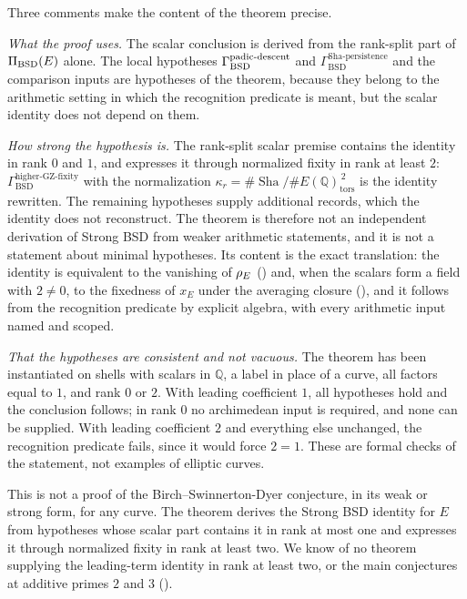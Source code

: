 \documentclass[11pt]{article}
\theoremstyle{definition}
\newcommand{\Q}{\mathbb{Q}}
\newcommand{\Sha}{\operatorname{Sha}}
\newcommand{\tors}{\operatorname{tors}}
\newcommand{\kapr}{\kappa_r}
\newcommand{\GammaSP}{\Gamma_{\mathrm{BSD}}^{\mathrm{Sha\text{-}persistence}}}
\newcommand{\GammaGZ}{\Gamma_{\mathrm{BSD}}^{\mathrm{higher\text{-}GZ\text{-}fixity}}}
\begin{document}
Three comments make the content of the theorem precise.

\emph{What the proof uses.}  The scalar conclusion is derived from the
rank-split part of $\Pi_{\mathrm{BSD}}(E)$ alone.  The local hypotheses $\Gamma_{\mathrm{BSD}}^{\mathrm{padic\text{-}descent}}$
and $\GammaSP$ and the comparison inputs are hypotheses of the theorem,
because they belong to the arithmetic setting in which the recognition
predicate is meant, but the scalar identity does not depend on them.

\emph{How strong the hypothesis is.}  The rank-split scalar premise
contains the identity in rank $0$ and $1$, and expresses it through
normalized fixity in rank at least $2$: $\GammaGZ$ with the normalization
$\kapr=\#\Sha/\#E(\Q)_{\tors}^{\,2}$ is the identity rewritten.  The
remaining hypotheses supply additional records, which the identity does
not reconstruct.  The theorem is therefore not an independent derivation of
Strong BSD from weaker arithmetic statements, and it is not a statement
about minimal hypotheses.  Its content is the exact translation: the
identity is equivalent to the vanishing of $\rho_E$
() and, when the scalars form a
field with $2\neq0$, to the fixedness of $x_E$ under the averaging closure
(),
and it follows from the recognition predicate by explicit algebra, with
every arithmetic input named and scoped.

\emph{That the hypotheses are consistent and not vacuous.}  The theorem
has been instantiated on shells with scalars in $\Q$, a label in place of
a curve, all factors equal to $1$, and rank $0$ or $2$.  With leading
coefficient $1$, all hypotheses hold and the conclusion follows; in rank
$0$ no archimedean input is required, and none can be supplied.  With
leading coefficient $2$ and everything else unchanged, the recognition
predicate fails, since it would force $2=1$.  These are formal checks of
the statement, not examples of elliptic curves.

\begin{nonclaim}\label{nonclaim:closure:landing-conditional}
This is not a proof of the Birch--Swinnerton-Dyer conjecture, in its weak
or strong form, for any curve.  The theorem derives the Strong BSD
identity for $E$ from hypotheses whose scalar part contains it in rank at
most one and expresses it through normalized fixity in rank at least two.
We know of no theorem supplying the leading-term identity in rank at
least two, or the main conjectures at additive primes $2$ and $3$
().
\end{nonclaim}
\end{document}
